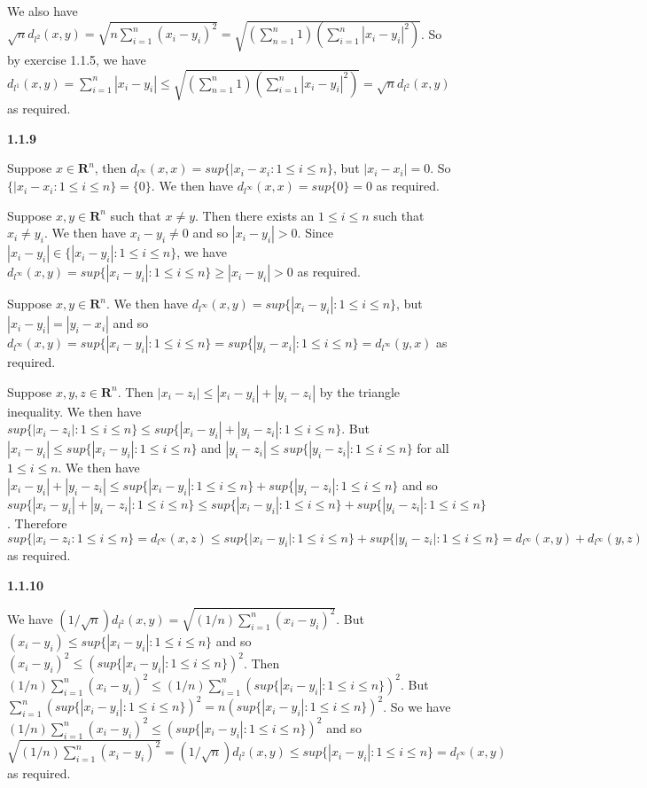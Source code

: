 \documentclass[12pt]{article}
\begin{document}
We also have $\sqrt{n}d_{l^2}(x,y) = \sqrt{n\sum_{i=1}^n(x_i-y_i)^2} = \sqrt{(\sum^n_{n=1}1)(\sum_{i=1}^n|x_i-y_i|^2)}$. So by exercise 1.1.5, we have $ d_{l^1}(x,y)=\sum^n_{i=1}|x_i-y_i|\leq\sqrt{(\sum^n_{n=1}1)(\sum_{i=1}^n|x_i-y_i|^2)}=\sqrt{n}d_{l^2}(x,y)$ as required. 

\textbf{1.1.9}

Suppose $x\in \textbf{R}^n$, then $d_{l^\infty}(x,x) = sup\{|x_i-x_i:1\leq i\leq n\}$, but $|x_i-x_i|=0$. So$\{|x_i-x_i:1\leq i\leq n\}=\{0\}$. We then have $d_{l^\infty}(x,x) = sup\{0\}=0$ as required. 

Suppose $x,y\in \textbf{R}^n$ such that $x\neq y$. Then there exists an $1\leq i\leq n$ such that $x_i\neq y_i$. We then have $x_i-y_i\neq 0$ and so $|x_i-y_i|>0$. Since $|x_i-y_i|\in \{|x_i-y_i|:1\leq i\leq n\}$, we have $d_{l^\infty}(x,y)=sup\{|x_i-y_i|:1\leq i\leq n\}\geq|x_i-y_i|>0$ as required. 

Suppose $x,y\in \textbf{R}^n$. We then have $d_{l^\infty}(x,y) = sup\{|x_i-y_i|:1\leq i\leq n\}$, but $|x_i-y_i|=|y_i-x_i|$ and so $ d_{l^\infty}(x,y)=sup\{|x_i-y_i|:1\leq i\leq n\} = sup\{|y_i-x_i|:1\leq i\leq n\} = d_{l^\infty}(y,x)$ as required. 

Suppose $x,y,z\in \textbf{R}^n$. Then $|x_i-z_i|\leq |x_i-y_i|+|y_i-z_i|$ by the triangle inequality. We then have $ sup\{|x_i-z_i|:1\leq i\leq n\}\leq sup\{|x_i-y_i|+|y_i-z_i|:1\leq i\leq n\}.$ But $|x_i-y_i|\leq sup\{|x_i-y_i|:1\leq i\leq n\}$ and $|y_i-z_i|\leq sup\{|y_i-z_i|:1\leq i\leq n\}$ for all $1\leq i\leq n$. We then have $|x_i-y_i|+|y_i-z_i|\leq sup\{|x_i-y_i|:1\leq i\leq n\}+sup\{|y_i-z_i|:1\leq i\leq n\}$ and so $sup\{|x_i-y_i|+|y_i-z_i|:1\leq i\leq n\}\leq sup\{|x_i-y_i|:1\leq i\leq n\}+sup\{|y_i-z_i|:1\leq i\leq n\}$. Therefore $sup\{|x_i-z_i:1\leq i\leq n\}=d_{l^\infty}(x,z)\leq sup\{|x_i-y_i|:1\leq i\leq n\}+sup\{|y_i-z_i|:1\leq i\leq n\}=d_{l^\infty}(x,y)+d_{l^\infty}(y,z)$ as required. 

\textbf{1.1.10}

We have $(1/\sqrt{n})d_{l^2}(x,y) = \sqrt{(1/n)\sum_{i=1}^n(x_i-y_i)^2}$. But $(x_i-y_i)\leq sup\{|x_i-y_i|:1\leq i\leq n\}$ and so $(x_i-y_i)^2\leq (sup\{|x_i-y_i|:1\leq i\leq n\})^2$. Then $(1/n)\sum_{i=1}^n(x_i-y_i)^2\leq (1/n)\sum_{i=1}^n(sup\{|x_i-y_i|:1\leq i\leq n\})^2$. But $\sum_{i=1}^n(sup\{|x_i-y_i|:1\leq i\leq n\})^2 = n(sup\{|x_i-y_i|:1\leq i\leq n\})^2$. So we have $(1/n)\sum_{i=1}^n(x_i-y_i)^2\leq (sup\{|x_i-y_i|:1\leq i\leq n\})^2$ and so $\sqrt{(1/n)\sum_{i=1}^n(x_i-y_i)^2} = (1/\sqrt{n})d_{l^2}(x,y)\leq sup\{|x_i-y_i|:1\leq i\leq n\}=d_{l^\infty}(x,y)$ as required. 
\end{document}
